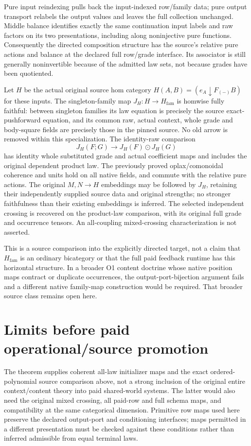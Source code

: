 \documentclass[11pt]{article}
\begin{document}
Pure input reindexing pulls back the input-indexed row/family data; pure output transport relabels the output values and leaves the full collection unchanged. Middle balance identifies exactly the same continuation input labels and raw factors on its two presentations, including along noninjective pure functions. Consequently the directed composition structure has the source's relative pure actions and balance at the declared full row/grade interface. Its associator is still generally noninvertible because of the admitted law sets, not because grades have been quotiented.

Let $H$ be the actual original source hom category $H(A,B)=(e_A\downarrow F_{(-)}B)$ for these inputs. The singleton-family map $J_H:H\to H_{\mathrm{fam}}$ is homwise fully faithful: between singleton families its law equation is precisely the source exact-pushforward equation, and its common raw, actual context, whole grade and body-square fields are precisely those in the pinned source. No old arrow is removed within this specialization. The identity-raw comparison
\[
 J_H(F;G)\longrightarrow J_H(F)\odot J_H(G)
\]
has identity whole substituted grade and actual coefficient maps and includes the original dependent product law. The previously proved oplax/comonoidal coherence and units hold on all native fields, and commute with the relative pure actions. The original $M,N\to H$ embeddings may be followed by $J_H$, retaining their independently supplied source data and original strengths; no stronger faithfulness than their existing embeddings is inferred. The selected independent crossing is recovered on the product-law comparison, with its original full grade and occurrence tensors. An all-coupling mixed-crossing characterization is not asserted.

This is a source comparison into the explicitly directed target, not a claim that $H_{\mathrm{fam}}$ is an ordinary bicategory or that the full paid feedback runtime has this horizontal structure. In a broader O1 content doctrine whose native position maps contract or duplicate occurrences, the output-port-bijection argument fails and a different native family-map construction would be required. That broader source class remains open here.

\section{Limits before paid operational/source promotion}
The theorem supplies coherent all-law initializer maps and the exact ordered-polynomial source comparison above, not a strong inclusion of the original entire context/content theory into paid shared-world systems. The latter would also need the original mixed crossing, all paid-row and full schema maps, and compatibility at the same categorical dimension. Primitive row maps used here preserve the declared output-port and conditioning interfaces; maps permitted in a different presentation must be checked against these conditions rather than inferred admissible from equal terminal laws.
\end{document}
